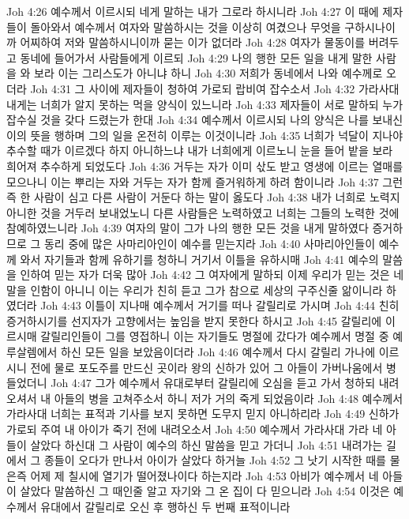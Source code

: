 Joh 4:26  예수께서 이르시되 네게 말하는 내가 그로라 하시니라
Joh 4:27  이 때에 제자들이 돌아와서 예수께서 여자와 말씀하시는 것을 이상히 여겼으나 무엇을 구하시나이까 어찌하여 저와 말씀하시니이까 묻는 이가 없더라
Joh 4:28  여자가 물동이를 버려두고 동네에 들어가서 사람들에게 이르되
Joh 4:29  나의 행한 모든 일을 내게 말한 사람을 와 보라 이는 그리스도가 아니냐 하니
Joh 4:30  저희가 동네에서 나와 예수께로 오더라
Joh 4:31  그 사이에 제자들이 청하여 가로되 랍비여 잡수소서
Joh 4:32  가라사대 내게는 너희가 알지 못하는 먹을 양식이 있느니라
Joh 4:33  제자들이 서로 말하되 누가 잡수실 것을 갖다 드렸는가 한대
Joh 4:34  예수께서 이르시되 나의 양식은 나를 보내신 이의 뜻을 행하며 그의 일을 온전히 이루는 이것이니라
Joh 4:35  너희가 넉달이 지나야 추수할 때가 이르겠다 하지 아니하느냐 내가 너희에게 이르노니 눈을 들어 밭을 보라 희어져 추수하게 되었도다
Joh 4:36  거두는 자가 이미 삯도 받고 영생에 이르는 열매를 모으나니 이는 뿌리는 자와 거두는 자가 함께 즐거워하게 하려 함이니라
Joh 4:37  그런즉 한 사람이 심고 다른 사람이 거둔다 하는 말이 옳도다
Joh 4:38  내가 너희로 노력지 아니한 것을 거두러 보내었노니 다른 사람들은 노력하였고 너희는 그들의 노력한 것에 참예하였느니라
Joh 4:39  여자의 말이 그가 나의 행한 모든 것을 내게 말하였다 증거하므로 그 동리 중에 많은 사마리아인이 예수를 믿는지라
Joh 4:40  사마리아인들이 예수께 와서 자기들과 함께 유하기를 청하니 거기서 이틀을 유하시매
Joh 4:41  예수의 말씀을 인하여 믿는 자가 더욱 많아
Joh 4:42  그 여자에게 말하되 이제 우리가 믿는 것은 네 말을 인함이 아니니 이는 우리가 친히 듣고 그가 참으로 세상의 구주신줄 앎이니라 하였더라
Joh 4:43  이틀이 지나매 예수께서 거기를 떠나 갈릴리로 가시며
Joh 4:44  친히 증거하시기를 선지자가 고향에서는 높임을 받지 못한다 하시고
Joh 4:45  갈릴리에 이르시매 갈릴리인들이 그를 영접하니 이는 자기들도 명절에 갔다가 예수께서 명절 중 예루살렘에서 하신 모든 일을 보았음이더라
Joh 4:46  예수께서 다시 갈릴리 가나에 이르시니 전에 물로 포도주를 만드신 곳이라 왕의 신하가 있어 그 아들이 가버나움에서 병들었더니
Joh 4:47  그가 예수께서 유대로부터 갈릴리에 오심을 듣고 가서 청하되 내려오셔서 내 아들의 병을 고쳐주소서 하니 저가 거의 죽게 되었음이라
Joh 4:48  예수께서 가라사대 너희는 표적과 기사를 보지 못하면 도무지 믿지 아니하리라
Joh 4:49  신하가 가로되 주여 내 아이가 죽기 전에 내려오소서
Joh 4:50  예수께서 가라사대 가라 네 아들이 살았다 하신대 그 사람이 예수의 하신 말씀을 믿고 가더니
Joh 4:51  내려가는 길에서 그 종들이 오다가 만나서 아이가 살았다 하거늘
Joh 4:52  그 낫기 시작한 때를 물은즉 어제 제 칠시에 열기가 떨어졌나이다 하는지라
Joh 4:53  아비가 예수께서 네 아들이 살았다 말씀하신 그 때인줄 알고 자기와 그 온 집이 다 믿으니라
Joh 4:54  이것은 예수께서 유대에서 갈릴리로 오신 후 행하신 두 번째 표적이니라

